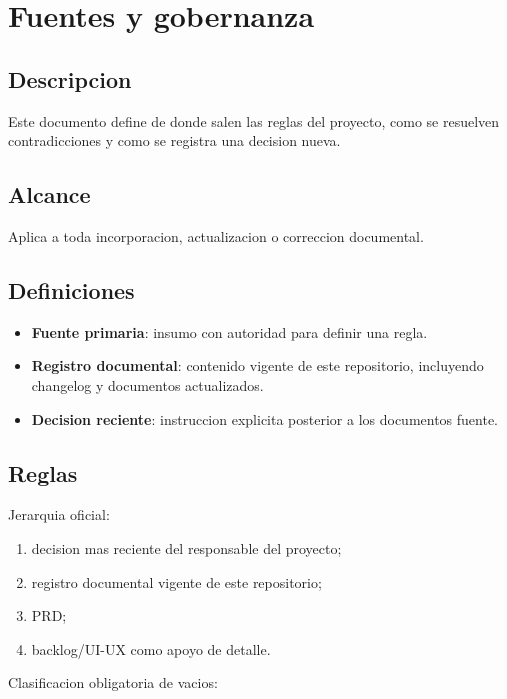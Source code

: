 \section{Fuentes y gobernanza}

\subsection{Descripcion}

Este documento define de donde salen las reglas del proyecto, como se resuelven contradicciones y como se registra una decision nueva.

\subsection{Alcance}

Aplica a toda incorporacion, actualizacion o correccion documental.

\subsection{Definiciones}

\begin{itemize}
  \item \textbf{Fuente primaria}: insumo con autoridad para definir una regla.
  \item \textbf{Registro documental}: contenido vigente de este repositorio, incluyendo changelog y documentos actualizados.
  \item \textbf{Decision reciente}: instruccion explicita posterior a los documentos fuente.
\end{itemize}

\subsection{Reglas}

Jerarquia oficial:

\begin{enumerate}
  \item decision mas reciente del responsable del proyecto;
  \item registro documental vigente de este repositorio;
  \item PRD;
  \item backlog/UI-UX como apoyo de detalle.
\end{enumerate}

Clasificacion obligatoria de vacios:


